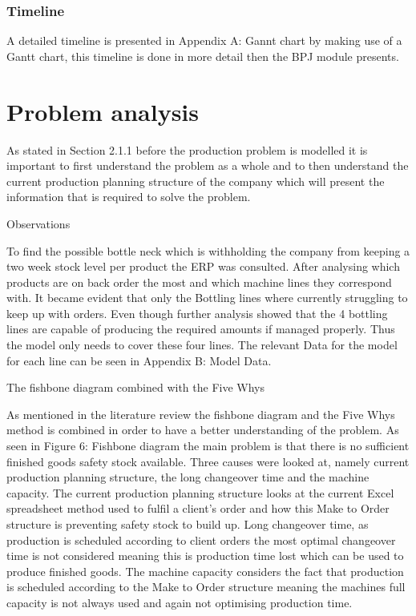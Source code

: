 \documentclass[a4paper,11pt,fleqn]{report}
\begin{document}
        \subsection{Timeline}
            A detailed timeline is presented in Appendix A: Gannt chart by making use of a Gantt chart, this timeline is done in more detail then the BPJ module presents.
            
\chapter{Problem analysis}
\acresetall

    As stated in Section 2.1.1 before the production problem is modelled it is important to first understand the problem as a whole and to then understand the current production planning structure of the company which will present the information that is required to solve the problem.
    
    Observations
    
    To find the possible bottle neck which is withholding the company from keeping a two week stock level per product the ERP was consulted. After analysing which products are on back order the most and which machine lines they correspond with. It became evident that only the Bottling lines where currently struggling to keep up with orders. Even though further analysis showed that the 4 bottling lines are capable of producing the required amounts if managed properly. Thus the model only needs to cover these four lines. The relevant Data for the model for each line can be seen in Appendix B: Model Data.
    
    The fishbone diagram combined with the Five Whys
    
    As mentioned in the literature review the fishbone diagram and the Five Whys method is combined in order to have a better understanding of the problem. As seen in Figure 6: Fishbone diagram the main problem is that there is no sufficient finished goods safety stock available. Three causes were looked at, namely current production planning structure, the long changeover time and the machine capacity. The current production planning structure looks at the current Excel spreadsheet method used to fulfil a client’s order and how this Make to Order structure is preventing safety stock to build up. Long changeover time, as production is scheduled according to client orders the most optimal changeover time is not considered meaning this is production time lost which can be used to produce finished goods.
    The machine capacity considers the fact that production is scheduled according to the Make to Order structure meaning the machines full capacity is not always used and again not optimising production time.
    
\end{document}
